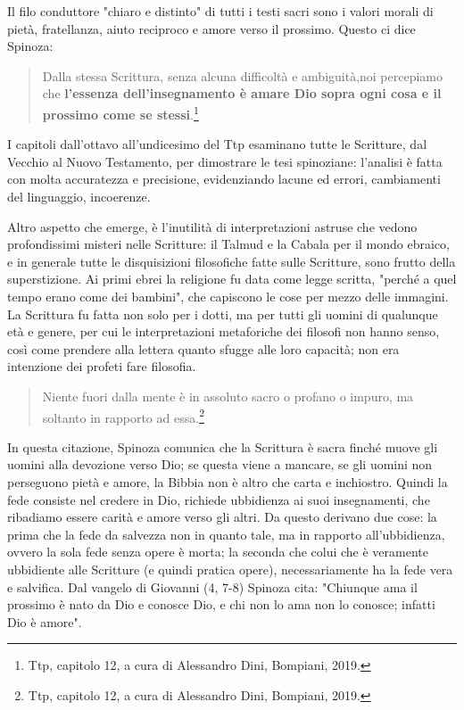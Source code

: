 Il filo conduttore "chiaro e distinto" di tutti i testi sacri sono i valori morali di pietà, fratellanza, aiuto reciproco e amore verso il prossimo. Questo ci dice Spinoza:

\begin{quotation}
	\small Dalla stessa Scrittura, senza alcuna difficoltà e ambiguità,noi percepiamo che \textbf{l'essenza dell'insegnamento è amare Dio sopra ogni cosa e il prossimo come se stessi}.\footnote{Ttp, capitolo 12, a cura di Alessandro Dini, Bompiani, 2019.}
 \end{quotation}

I capitoli dall'ottavo all'undicesimo del Ttp esaminano tutte le Scritture, dal Vecchio al Nuovo Testamento, per dimostrare le tesi spinoziane: l'analisi è fatta con molta accuratezza e precisione, evidenziando lacune ed errori, cambiamenti del linguaggio, incoerenze.

Altro aspetto che emerge, è l'inutilità di interpretazioni astruse che vedono profondissimi misteri nelle Scritture: il Talmud e la Cabala per il mondo ebraico, e in generale tutte le disquisizioni filosofiche fatte sulle Scritture, sono frutto della superstizione.
Ai primi ebrei la religione fu data come legge scritta, "perché a quel tempo erano come dei bambini", che capiscono le cose per mezzo delle immagini. La Scrittura fu fatta non solo per i dotti, ma per tutti gli uomini di qualunque età e genere, per cui le interpretazioni metaforiche dei filosofi non hanno senso, così come  prendere alla lettera quanto sfugge alle loro capacità; non era intenzione dei profeti fare filosofia.

\begin{quotation}
	\small Niente fuori dalla mente è in assoluto sacro o profano o impuro, ma soltanto in rapporto ad essa.\footnote{Ttp, capitolo 12, a cura di Alessandro Dini, Bompiani, 2019.}
\end{quotation}

In questa citazione, Spinoza comunica che la Scrittura è sacra finché muove gli uomini alla devozione verso Dio; se questa viene a mancare, se gli uomini non perseguono pietà e amore,  la Bibbia non è altro che carta e inchiostro.
Quindi la fede consiste nel credere in Dio, richiede ubbidienza ai suoi insegnamenti, che ribadiamo essere carità e amore verso gli altri. Da questo derivano due cose: la prima che la fede da salvezza non in quanto tale, ma in rapporto all'ubbidienza, ovvero la sola fede senza opere è morta; la seconda che colui che è veramente ubbidiente alle Scritture (e quindi pratica opere), necessariamente ha la fede vera e salvifica. Dal vangelo di Giovanni (4, 7-8) Spinoza cita: "Chiunque ama il prossimo è nato da Dio e conosce Dio, e chi non lo ama non lo conosce; infatti Dio è amore".

